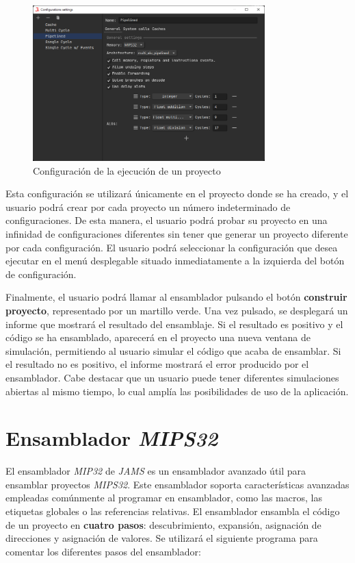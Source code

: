 \begin{figure}[h]
    \centering
    \includegraphics[width=0.8\textwidth]{images/mips/mips-configuration}
    \caption{Configuración de la ejecución de un proyecto}
    \label{fig:jams-configuration}
\end{figure}

Esta configuración se utilizará únicamente en el proyecto
donde se ha creado, y el usuario podrá crear por cada proyecto
un número indeterminado de configuraciones.
De esta manera, el usuario podrá probar su proyecto en una infinidad
de configuraciones diferentes sin tener que generar un proyecto
diferente por cada configuración.
El usuario podrá seleccionar la configuración que desea ejecutar en
el menú desplegable situado inmediatamente a la izquierda del
botón de configuración.

Finalmente, el usuario podrá llamar al ensamblador pulsando el botón
\textbf{construir proyecto}, representado por un martillo verde.
Una vez pulsado, se desplegará un informe que mostrará el resultado del ensamblaje.
Si el resultado es positivo y el código se ha ensamblado,
aparecerá en el proyecto una nueva ventana de simulación,
permitiendo al usuario simular el código que acaba de ensamblar.
Si el resultado no es positivo, el informe mostrará el error producido
por el ensamblador.
Cabe destacar que un usuario puede tener diferentes simulaciones abiertas
al mismo tiempo, lo cual amplía las posibilidades de uso de la
aplicación.


\section{Ensamblador \textit{MIPS32}}\label{sec:ensamblador-mips32}

El ensamblador \textit{MIP32} de \textit{JAMS} es un ensamblador avanzado
útil para ensamblar proyectos \textit{MIPS32}.
Este ensamblador soporta características avanzadas empleadas
comúnmente al programar en ensamblador, como las macros,
las etiquetas globales o las referencias relativas.
El ensamblador ensambla el código de un proyecto en \textbf{cuatro pasos}:
descubrimiento, expansión, asignación de direcciones y asignación de valores.
Se utilizará el siguiente programa para comentar los diferentes pasos del ensamblador:

